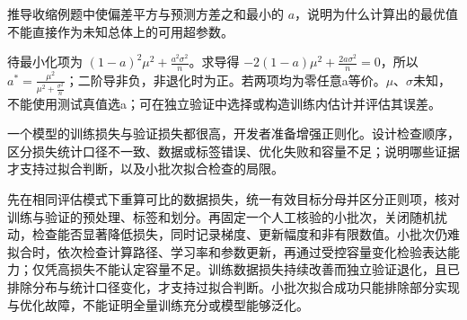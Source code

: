 \begin{exercises}
\begin{exercise}\optional 推导收缩例题中使偏差平方与预测方差之和最小的 $a$，说明为什么计算出的最优值不能直接作为未知总体上的可用超参数。

\begin{solution}
待最小化项为 $(1-a)^2\mu^2+\frac{a^2\sigma^2}{n}$。求导得 $-2(1-a)\mu^2+\frac{2a\sigma^2}{n}=0$，所以 $a^*=\frac{\mu^2}{\mu^2+\frac{\sigma^2}{n}}$；二阶导非负，非退化时为正。若两项均为零任意a等价。$\mu$、$\sigma$未知，不能使用测试真值选a；可在独立验证中选择或构造训练内估计并评估其误差。
\end{solution}
\end{exercise}

\begin{exercise} 一个模型的训练损失与验证损失都很高，开发者准备增强正则化。设计检查顺序，区分损失统计口径不一致、数据或标签错误、优化失败和容量不足；说明哪些证据才支持过拟合判断，以及小批次拟合检查的局限。

\begin{solution}
先在相同评估模式下重算可比的数据损失，统一有效目标分母并区分正则项，核对训练与验证的预处理、标签和划分。再固定一个人工核验的小批次，关闭随机扰动，检查能否显著降低损失，同时记录梯度、更新幅度和非有限数值。小批次仍难拟合时，依次检查计算路径、学习率和参数更新，再通过受控容量变化检验表达能力；仅凭高损失不能认定容量不足。训练数据损失持续改善而独立验证退化，且已排除分布与统计口径变化，才支持过拟合判断。小批次拟合成功只能排除部分实现与优化故障，不能证明全量训练充分或模型能够泛化。
\end{solution}
\end{exercise}

\end{exercises}
